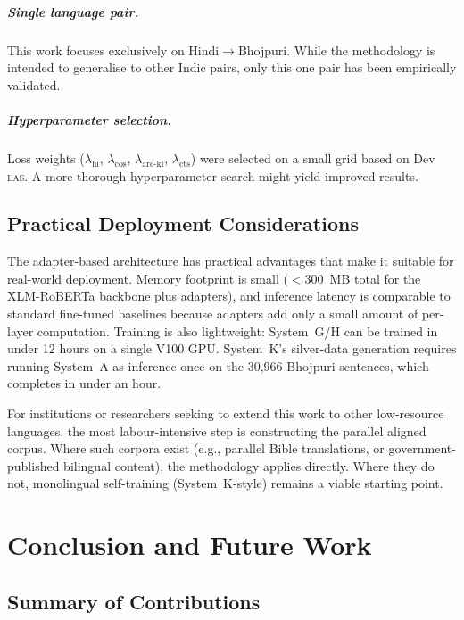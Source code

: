 \documentclass[12pt,a4paper,oneside]{report}
\newcommand{\xlmr}{XLM-RoBERTa}
\newcommand{\las}{\textsc{las}}
\begin{document}
\paragraph{Single language pair.}
This work focuses exclusively on Hindi$\to$Bhojpuri. While the methodology is
intended to generalise to other Indic pairs, only this one pair has been
empirically validated.

\paragraph{Hyperparameter selection.}
Loss weights ($\lambda_{\text{hi}}$, $\lambda_{\text{cos}}$,
$\lambda_{\text{arc-kl}}$, $\lambda_{\text{cts}}$) were selected on a small
grid based on Dev \las{}. A more thorough hyperparameter search might yield
improved results.

\section{Practical Deployment Considerations}

The adapter-based architecture has practical advantages that make it suitable
for real-world deployment. Memory footprint is small ($<300$~MB total for the
\xlmr{} backbone plus adapters), and inference latency is comparable to
standard fine-tuned baselines because adapters add only a small amount of
per-layer computation. Training is also lightweight: System~G/H can be trained
in under 12 hours on a single V100 GPU. System~K's silver-data generation
requires running System~A as inference once on the 30,966 Bhojpuri sentences,
which completes in under an hour.

For institutions or researchers seeking to extend this work to other
low-resource languages, the most labour-intensive step is constructing the
parallel aligned corpus. Where such corpora exist (e.g., parallel Bible
translations, or government-published bilingual content), the methodology
applies directly. Where they do not, monolingual self-training (System~K-style)
remains a viable starting point.


\chapter{Conclusion and Future Work}
\label{chap:conclusion}

\section{Summary of Contributions}
\end{document}

